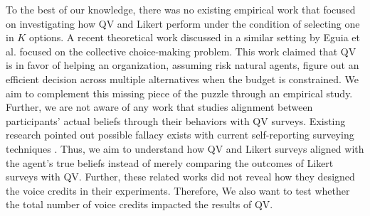 To the best of our knowledge, there was no existing empirical work that focused on investigating how QV and Likert perform under the condition of selecting one in $K$ options. A recent theoretical work discussed in a similar setting by Eguia et al. \cite{eguia2019quadratic} focused on the collective choice-making problem. This work claimed that QV is in favor of helping an organization, assuming risk natural agents, figure out an efficient decision across multiple alternatives when the budget is constrained. We aim to complement this missing piece of the puzzle through an empirical study. Further, we are not aware of any work that studies alignment between participants' actual beliefs through their behaviors with QV surveys. Existing research pointed out possible fallacy exists with current self-reporting surveying techniques \cite{araujo2017much, vavreck2007exaggerated}. Thus, we aim to understand how QV and Likert surveys aligned with the agent's true beliefs instead of merely comparing the outcomes of Likert surveys with QV. Further, these related works did not reveal how they designed the voice credits in their experiments. Therefore, We also want to test whether the total number of voice credits impacted the results of QV. 



